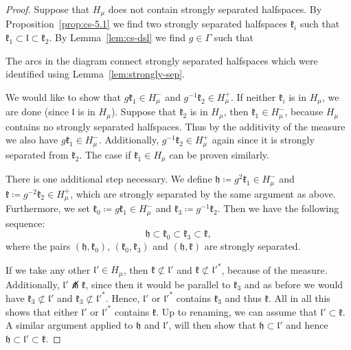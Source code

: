 \begin{proof}
  Suppose that \(H_\mu\) does not contain strongly separated halfspaces. By Proposition\ \ref{prop:cs-5.1} we find two strongly separated halfspaces \(\mathfrak{k}_i\) such that \(\mathfrak{k}_1 \subset \mathfrak{l} \subset \mathfrak{k}_2\). By Lemma~\ref{lem:cs-dsl} we find \(g \in \Gamma\) such that
  \begin{center}
    
  \end{center}
  The arcs in the diagram connect strongly separated halfspaces which were identified using Lemma~\ref{lem:strongly-sep}.

  We would like to show that \(g\mathfrak{k}_1 \in H_\mu^-\) and \(g^{-1}\mathfrak{k}_2 \in H_\mu^+\). If neither \(\mathfrak{k}_i\) is in \(H_\mu\), we are done (since \(\mathfrak{l}\) is in \(H_\mu\)). Suppose that \(\mathfrak{k}_2\) is in \(H_\mu\), then \(\mathfrak{k}_1 \in H_\mu^-\), because \(H_\mu\) contains no strongly separated halfspaces. Thus by the additivity of the measure we also have \(g\mathfrak{k}_1 \in H_\mu^-\). Additionally, \(g^{-1}\mathfrak{k}_2 \in H_\mu^+\) again since it is strongly separated from \(\mathfrak{k}_2\). The case if \(\mathfrak{k}_1 \in H_\mu\) can be proven similarly.

  There is one additional step necessary. We define \(\mathfrak{h} \coloneqq g^2\mathfrak{k}_1 \in H_\mu^-\) and \(\mathfrak{k} \coloneqq g^{-2}\mathfrak{k}_2 \in H_\mu^+\), which are strongly separated by the same argument as above. Furthermore, we set \(\mathfrak{k_0} \coloneqq g\mathfrak{k}_1 \in H_\mu^-\) and \(\mathfrak{k}_3 \coloneqq g^{-1}\mathfrak{k}_2\). Then we have the following sequence:
  \[
    \mathfrak{h} \subset \mathfrak{k}_0 \subset \mathfrak{k}_3 \subset \mathfrak{k},
  \]
  where the pairs \((\mathfrak{h}, \mathfrak{k}_0)\), \((\mathfrak{k_0}, \mathfrak{k}_3)\) and \((\mathfrak{h}, \mathfrak{k})\) are strongly separated. 

  If we take any other \(\mathfrak{l}' \in H_\mu\), then \(\mathfrak{k} \not\subset \mathfrak{l}'\) and \(\mathfrak{k} \not \subset \mathfrak{l}'^\ast\), because of the measure. Additionally, \(\mathfrak{l}' \not\pitchfork \mathfrak{k}\), since then it would be parallel to \(\mathfrak{k}_3\) and as before we would have \(\mathfrak{k}_3 \not\subset \mathfrak{l}'\) and \(\mathfrak{k}_3 \not\subset \mathfrak{l}'^\ast\). Hence, \(\mathfrak{l}'\) or \(\mathfrak{l}'^\ast\) contains \(\mathfrak{k}_3\) and thus \(\mathfrak{k}\). All in all this shows that either \(\mathfrak{l}'\) or \(\mathfrak{l}'^\ast\) contains \(\mathfrak{k}\). Up to renaming, we can assume that \(\mathfrak{l}' \subset \mathfrak{k}\). A similar argument applied to \(\mathfrak{h}\) and \(\mathfrak{l}'\), will then show that \(\mathfrak{h} \subset \mathfrak{l}'\) and hence \(\mathfrak{h} \subset \mathfrak{l}' \subset \mathfrak{k}\).
\end{proof}


